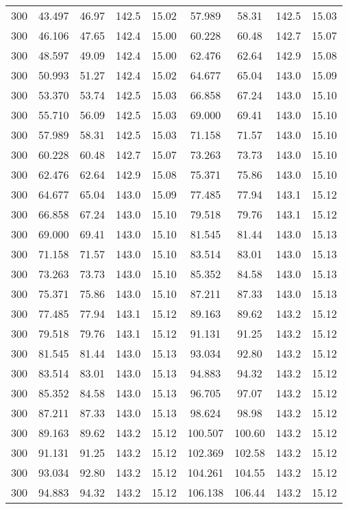 \documentclass[
        captions=tableheading,
        titlepage=firstiscover,
        bibliography
    ]{scrartcl}
\begin{document}
\begin{table}
\begin{tabular}{S[table-format=3.0] S[table-format=2.3] S S[table-format=3.1] S S[table-format=3.3] S[table-format=3.2] S[table-format=3.1] S}
     300 & 43.497  & 46.97  & 142.5 & 15.02 & 57.989  & 58.31  & 142.5 & 15.03 \\
     300 & 46.106  & 47.65  & 142.4 & 15.00 & 60.228  & 60.48  & 142.7 & 15.07 \\
     300 & 48.597  & 49.09  & 142.4 & 15.00 & 62.476  & 62.64  & 142.9 & 15.08 \\
     300 & 50.993  & 51.27  & 142.4 & 15.02 & 64.677  & 65.04  & 143.0 & 15.09 \\
     300 & 53.370  & 53.74  & 142.5 & 15.03 & 66.858  & 67.24  & 143.0 & 15.10 \\
     300 & 55.710  & 56.09  & 142.5 & 15.03 & 69.000  & 69.41  & 143.0 & 15.10 \\
     300 & 57.989  & 58.31  & 142.5 & 15.03 & 71.158  & 71.57  & 143.0 & 15.10 \\
     300 & 60.228  & 60.48  & 142.7 & 15.07 & 73.263  & 73.73  & 143.0 & 15.10 \\
     300 & 62.476  & 62.64  & 142.9 & 15.08 & 75.371  & 75.86  & 143.0 & 15.10 \\ 
     300 & 64.677  & 65.04  & 143.0 & 15.09 & 77.485  & 77.94  & 143.1 & 15.12 \\
     300 & 66.858  & 67.24  & 143.0 & 15.10 & 79.518  & 79.76  & 143.1 & 15.12 \\
     300 & 69.000  & 69.41  & 143.0 & 15.10 & 81.545  & 81.44  & 143.0 & 15.13 \\
     300 & 71.158  & 71.57  & 143.0 & 15.10 & 83.514  & 83.01  & 143.0 & 15.13 \\
     300 & 73.263  & 73.73  & 143.0 & 15.10 & 85.352  & 84.58  & 143.0 & 15.13 \\
     300 & 75.371  & 75.86  & 143.0 & 15.10 & 87.211  & 87.33  & 143.0 & 15.13 \\
     300 & 77.485  & 77.94  & 143.1 & 15.12 & 89.163  & 89.62  & 143.2 & 15.12 \\
     300 & 79.518  & 79.76  & 143.1 & 15.12 & 91.131  & 91.25  & 143.2 & 15.12 \\
     300 & 81.545  & 81.44  & 143.0 & 15.13 & 93.034  & 92.80  & 143.2 & 15.12 \\
     300 & 83.514  & 83.01  & 143.0 & 15.13 & 94.883  & 94.32  & 143.2 & 15.12 \\
     300 & 85.352  & 84.58  & 143.0 & 15.13 & 96.705  & 97.07  & 143.2 & 15.12 \\
     300 & 87.211  & 87.33  & 143.0 & 15.13 & 98.624  & 98.98  & 143.2 & 15.12 \\
     300 & 89.163  & 89.62  & 143.2 & 15.12 & 100.507 & 100.60 & 143.2 & 15.12 \\
     300 & 91.131  & 91.25  & 143.2 & 15.12 & 102.369 & 102.58 & 143.2 & 15.12 \\
     300 & 93.034  & 92.80  & 143.2 & 15.12 & 104.261 & 104.55 & 143.2 & 15.12 \\
     300 & 94.883  & 94.32  & 143.2 & 15.12 & 106.138 & 106.44 & 143.2 & 15.12 \\
    \bottomrule
  \end{tabular}
\end{table}
\end{document}
